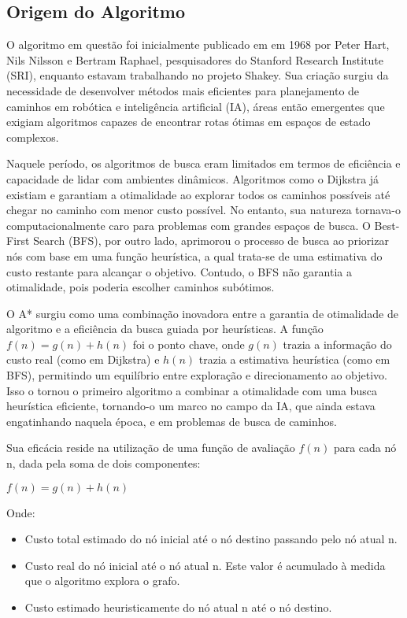 \documentclass[conference]{IEEEtran}
\begin{document}
\subsection{Origem do Algoritmo}
O algoritmo em questão foi inicialmente publicado em em 1968 por Peter Hart, Nils Nilsson e Bertram Raphael, pesquisadores do Stanford Research Institute (SRI), enquanto estavam trabalhando no projeto Shakey. Sua criação surgiu da necessidade de desenvolver métodos mais eficientes para planejamento de caminhos em robótica e inteligência artificial (IA), áreas então emergentes que exigiam algoritmos capazes de encontrar rotas ótimas em espaços de estado complexos.

Naquele período, os algoritmos de busca eram limitados em termos de eficiência e capacidade de lidar com ambientes dinâmicos. Algoritmos como o Dijkstra já existiam e garantiam a otimalidade ao explorar todos os caminhos possíveis até chegar no caminho com menor custo possível. No entanto, sua natureza tornava-o computacionalmente caro para problemas com grandes espaços de busca. O Best-First Search (BFS), por outro lado, aprimorou o processo de busca ao priorizar nós com base em uma função heurística, a qual trata-se de uma estimativa do custo restante para alcançar o objetivo. Contudo, o BFS não garantia a otimalidade, pois poderia escolher caminhos subótimos.

O A* surgiu como uma combinação inovadora entre a garantia de otimalidade de algoritmo e a eficiência da busca guiada por heurísticas. A função $f(n)=g(n)+h(n)$ foi o ponto chave, onde $g(n)$ trazia a informação do custo real (como em Dijkstra) e $h(n)$ trazia a estimativa heurística (como em BFS), permitindo um equilíbrio entre exploração e direcionamento ao objetivo. Isso o tornou o primeiro algoritmo a combinar a otimalidade com uma busca heurística eficiente, tornando-o um marco no campo da IA, que ainda estava engatinhando naquela época, e em problemas de busca de caminhos.

Sua eficácia reside na utilização de uma função de avaliação $f(n)$ para cada nó n, dada pela soma de dois componentes: 
\begin{center}
  $f(n) = g(n) + h(n)$
\end{center}

Onde:
\begin{itemize}
  \item {} Custo total estimado do nó inicial até o nó destino passando pelo nó atual n.
  \item {} Custo real do nó inicial até o nó atual n. Este valor é acumulado à medida que o algoritmo explora o grafo.
  \item {} Custo estimado heuristicamente do nó atual n até o nó destino.
\end{itemize}
\end{document}
